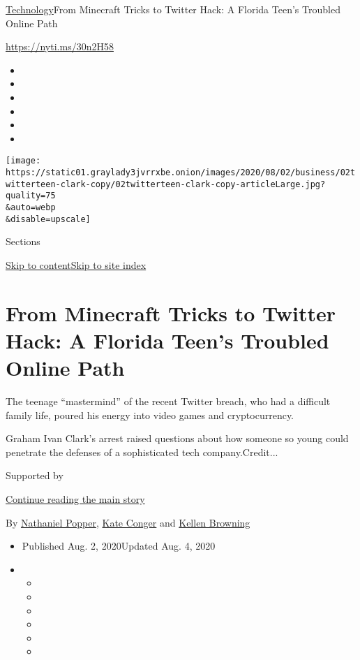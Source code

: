 \href{/section/technology}{Technology}\textbar{}From Minecraft Tricks to
Twitter Hack: A Florida Teen's Troubled Online Path

\href{https://nyti.ms/30n2H58}{https://nyti.ms/30n2H58}

\begin{itemize}
\item
\item
\item
\item
\item
\item
\end{itemize}

\texttt{[image: https://static01.graylady3jvrrxbe.onion/images/2020/08/02/business/02twitterteen-clark-copy/02twitterteen-clark-copy-articleLarge.jpg?quality=75\\\&auto=webp\\\&disable=upscale]}

Sections

\protect\hyperlink{site-content}{Skip to
content}\protect\hyperlink{site-index}{Skip to site index}

\hypertarget{from-minecraft-tricks-to-twitter-hack-a-florida-teens-troubled-online-path}{%
\section{From Minecraft Tricks to Twitter Hack: A Florida Teen's
Troubled Online
Path}\label{from-minecraft-tricks-to-twitter-hack-a-florida-teens-troubled-online-path}}

The teenage ``mastermind'' of the recent Twitter breach, who had a
difficult family life, poured his energy into video games and
cryptocurrency.

Graham Ivan Clark's arrest raised questions about how someone so young
could penetrate the defenses of a sophisticated tech company.Credit...

Supported by

\protect\hyperlink{after-sponsor}{Continue reading the main story}

By
\href{https://www.nytimes3xbfgragh.onion/by/nathaniel-popper}{Nathaniel
Popper}, \href{https://www.nytimes3xbfgragh.onion/by/kate-conger}{Kate
Conger} and
\href{https://www.nytimes3xbfgragh.onion/by/kellen-browning}{Kellen
Browning}

\begin{itemize}
\item
  Published Aug. 2, 2020Updated Aug. 4, 2020
\item
  \begin{itemize}
  \item
  \item
  \item
  \item
  \item
  \item
  \end{itemize}
\end{itemize}

